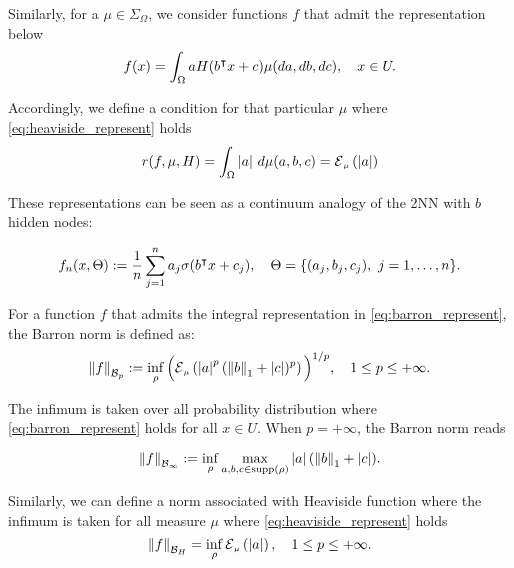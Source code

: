 Similarly, for a $\mu \in \Sigma_{\Omega}$, we consider functions $f$ that admit
the representation below
\begin{equation}
    \label{eq:heaviside_represent}
    f(x) = \int_{\Omega} a H(b{}^{\intercal} x + c) \mu(da, db, dc), \quad x \in U.
\end{equation}

Accordingly, we define a condition for that particular $\mu$ where
\eqref{eq:heaviside_represent} holds
\begin{align}
    r(f,\mu, H)
    = \int_{\Omega} \abs{a}\,d\mu(a,b,c) = \ERWi{\mu}{\abs{a}}
\end{align}

These representations can be seen as a continuum analogy of the 2NN with $b$
hidden nodes:

\begin{equation}
    f_n(x, \Theta) := \frac{1}{n}
    \sum_{j=1}^n a_j 
        \sigma(b{}^{\intercal} x + c_j), 
    \quad \Theta = \{(a_j, b_j, c_j), \ j = 1, \dots, n\}.
\end{equation}

\begin{definition} For a function $f$ that admits the integral
    representation in \eqref{eq:barron_represent}, the Barron norm is defined as:
    \begin{equation}\label{eq:barron_norm}
        \barronnorm{f}{p} := \inf_{\rho} \Big(\ERWi{\mu}{\abs{a}^p 
        (\norm{b}_1 + \abs{c})^p}\Big)^{1/p},
        \quad 1 \leq p \leq +\infty.
    \end{equation}
\end{definition}

The infimum is taken over all probability distribution where
\eqref{eq:barron_represent} holds for all $x \in U$. When $p = + \infty$, the
Barron norm reads

\begin{equation}
    \label{eq:barron_infinite_norm}
    \left\| {f} \right\|_{\mathcal{B}_{\infty}} :=
    \inf_{\rho} \max_{a, b, c \in \operatorname{supp}(\rho)} \left| a \right| (\left\| b \right\|_1 + \left| c \right|).
\end{equation}

Similarly, we can define a norm associated with Heaviside function where the
infimum is taken for all measure $\mu$ where \eqref{eq:heaviside_represent}
holds
\begin{equation}
    \label{def:heaviside_norm}
    \norm{f}_{\mcal{B}_H} = \inf_{\rho} \ERWi{\mu}{\abs{a}},
    \quad 1 \leq p \leq +\infty.
\end{equation}

